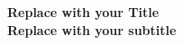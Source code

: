 
\thispagestyle{empty}


	\begin{center}
		\bfseries \sffamily \LARGE Replace with your Title\\
		Replace with your subtitle
    \end{center}
	~\\
~\\

\newpage
